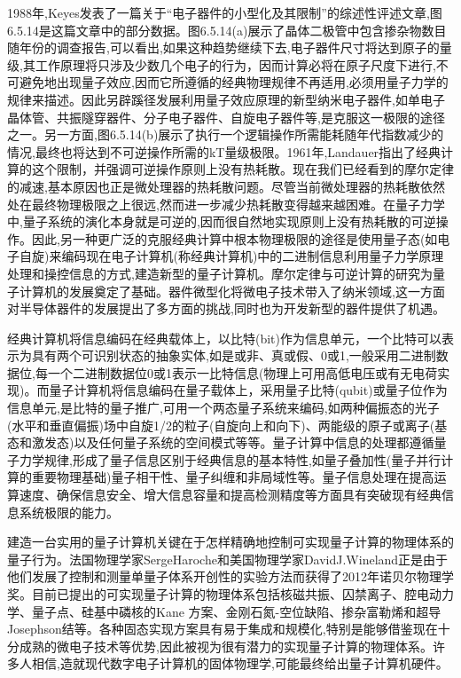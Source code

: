 1988年,Keyes发表了一篇关于“电子器件的小型化及其限制”的综述性评述文章,图6.5.14是这篇文章中的部分数据。图6.5.14(a)展示了晶体二极管中包含掺杂物数目随年份的调查报告,可以看出,如果这种趋势继续下去,电子器件尺寸将达到原子的量级,其工作原理将只涉及少数几个电子的行为，因而计算必将在原子尺度下进行,不可避免地出现量子效应,因而它所遵循的经典物理规律不再适用,必须用量子力学的规律来描述。因此另辟蹊径发展利用量子效应原理的新型纳米电子器件,如单电子晶体管、共振隧穿器件、分子电子器件、自旋电子器件等,是克服这一极限的途径之一。另一方面,图6.5.14(b)展示了执行一个逻辑操作所需能耗随年代指数减少的情况,最终也将达到不可逆操作所需的kT量级极限。1961年,Landauer指出了经典计算的这个限制，并强调可逆操作原则上没有热耗散。现在我们已经看到的摩尔定律的减速,基本原因也正是微处理器的热耗散问题。尽管当前微处理器的热耗散依然处在最终物理极限之上很远,然而进一步减少热耗散变得越来越困难。在量子力学中,量子系统的演化本身就是可逆的,因而很自然地实现原则上没有热耗散的可逆操作。因此,另一种更广泛的克服经典计算中根本物理极限的途径是使用量子态(如电子自旋)来编码现在电子计算机(称经典计算机)中的二进制信息利用量子力学原理处理和操控信息的方式,建造新型的量子计算机。摩尔定律与可逆计算的研究为量子计算机的发展奠定了基础。器件微型化将微电子技术带入了纳米领域,这一方面对半导体器件的发展提出了多方面的挑战,同时也为开发新型的器件提供了机遇。



经典计算机将信息编码在经典载体上，以比特(bit)作为信息单元，一个比特可以表示为具有两个可识别状态的抽象实体,如是或非、真或假、0或1,一般采用二进制数据位,每一个二进制数据位0或1表示一比特信息(物理上可用高低电压或有无电荷实现)。而量子计算机将信息编码在量子载体上，采用量子比特(qubit)或量子位作为信息单元,是比特的量子推广,可用一个两态量子系统来编码,如两种偏振态的光子(水平和垂直偏振)场中自旋1/2的粒子(自旋向上和向下)、两能级的原子或离子(基态和激发态)以及任何量子系统的空间模式等等。量子计算中信息的处理都遵循量子力学规律,形成了量子信息区别于经典信息的基本特性,如量子叠加性(量子并行计算的重要物理基础)量子相干性、量子纠缠和非局域性等。量子信息处理在提高运算速度、确保信息安全、增大信息容量和提高检测精度等方面具有突破现有经典信息系统极限的能力。

建造一台实用的量子计算机关键在于怎样精确地控制可实现量子计算的物理体系的量子行为。法国物理学家SergeHaroche和美国物理学家DavidJ.Wineland正是由于他们发展了控制和测量单量子体系开创性的实验方法而获得了2012年诺贝尔物理学奖。目前已提出的可实现量子计算的物理体系包括核磁共振、囚禁离子、腔电动力学、量子点、硅基中磷核的Kane 方案、金刚石氮-空位缺陷、掺杂富勒烯和超导 Josephson结等。各种固态实现方案具有易于集成和规模化,特别是能够借鉴现在十分成熟的微电子技术等优势,因此被视为很有潜力的实现量子计算的物理体系。许多人相信,造就现代数字电子计算机的固体物理学,可能最终给出量子计算机硬件。
